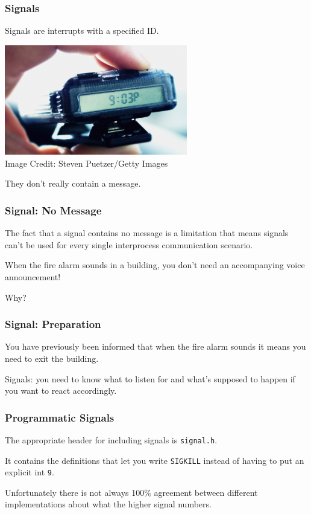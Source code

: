 \begin{frame}
	\frametitle{Signals}

	Signals are interrupts with a specified ID.

	\begin{center}
		\includegraphics[width=0.6\textwidth]{images/pager.jpg}\\
		Image Credit:  Steven Puetzer/Getty Images
	\end{center}

	They don't really contain a message.

\end{frame}


\begin{frame}
	\frametitle{Signal: No Message}

	The fact that a signal contains no message is a limitation that means signals can't be used for every single interprocess communication scenario.

	When the fire alarm sounds in a building, you don't need an accompanying voice announcement!

	Why?

\end{frame}



\begin{frame}
	\frametitle{Signal: Preparation}

	You have previously been informed that when the fire alarm sounds it means you need to exit the building.

	Signals: you need to know what to listen for and what's supposed to happen if you want to react accordingly.

\end{frame}


\begin{frame}
	\frametitle{Programmatic Signals}

	The appropriate header for including signals is \texttt{signal.h}.

	It contains the definitions that let you write \texttt{SIGKILL} instead of having to put an explicit int \texttt{9}.

	Unfortunately there is not always 100\% agreement between different implementations about what the higher signal numbers.

\end{frame}


